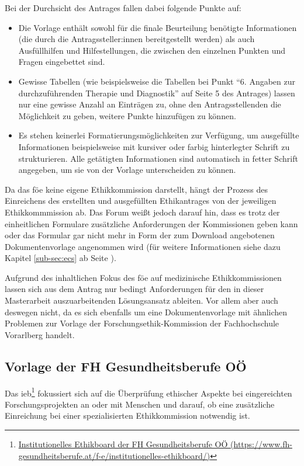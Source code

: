 \documentclass[a4paper,12pt,twoside]{scrreprt}
\begin{document}
Bei der Durchsicht des Antrages fallen dabei folgende Punkte auf:
\begin{itemize}
    \item Die Vorlage enthält sowohl für die finale Beurteilung benötigte Informationen (die durch die Antragssteller:innen bereitgestellt werden) als auch Ausfüllhilfen und Hilfestellungen, die zwischen den einzelnen Punkten und Fragen eingebettet sind.
    \item Gewisse Tabellen (wie beispielsweise die Tabellen bei Punkt \enquote{6. Angaben zur durchzuführenden Therapie und Diagnostik} auf Seite 5 des Antrages) lassen nur eine gewisse Anzahl an Einträgen zu, ohne den Antragsstellenden die Möglichkeit zu geben, weitere Punkte hinzufügen zu können.
    \item Es stehen keinerlei Formatierungsmöglichkeiten zur Verfügung, um ausgefüllte Informationen beispielsweise mit kursiver oder farbig hinterlegter Schrift zu strukturieren. Alle getätigten Informationen sind automatisch in fetter Schrift angegeben, um sie von der Vorlage unterscheiden zu können.
\end{itemize}

Da das \ac{föe} keine eigene Ethikkommission darstellt, hängt der Prozess des Einreichens des erstellten und ausgefüllten Ethikantrages von der jeweiligen Ethikkommmission ab. Das Forum weißt jedoch darauf hin, dass es trotz der einheitlichen Formulare zusätzliche Anforderungen der Kommissionen geben kann oder das Formular gar nicht mehr in Form der zum Download angebotenen Dokumentenvorlage angenommen wird (für weitere Informationen siehe dazu Kapitel \ref{sub-sec:ecs} ab Seite \pageref{sub-sec:ecs}). \cite{ethikkommission_der_medizinischen_universitat_graz_download_2012}

Aufgrund des inhaltlichen Fokus des \acl{föe} auf medizinische Ethikkommissionen lassen sich aus dem Antrag nur bedingt Anforderungen für den in dieser Masterarbeit auszuarbeitenden Lösungsansatz ableiten. Vor allem aber auch deswegen nicht, da es sich ebenfalls um eine Dokumentenvorlage mit ähnlichen Problemen zur Vorlage der Forschungsethik-Kommission der Fachhochschule Vorarlberg handelt.

\subsection{Vorlage der FH Gesundheitsberufe OÖ}
\label{sub-cec:vorlage-fh-oö}

Das \ac{ieb}\footnote{\href{https://www.fh-gesundheitsberufe.at/f-e/institutionelles-ethikboard/}{Institutionelles Ethikboard der FH Gesundheitsberufe OÖ (\url{https://www.fh-gesundheitsberufe.at/f-e/institutionelles-ethikboard/})}} fokussiert sich auf die Überprüfung ethischer Aspekte bei eingereichten Forschungsprojekten an oder mit Menschen und darauf, ob eine zusätzliche Einreichung bei einer spezialisierten Ethikkommission notwendig ist. \cite{fh_gesundheitsberufe_oo_gmbh_institutionelles_2023}
\end{document}
